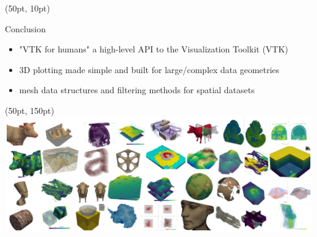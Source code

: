 \documentclass[aspectratio=169,12pt]{beamer}
\begin{document}
\begin{frame}[fragile]
\begin{textblock*}{800pt}(50pt, 10pt)
\begin{block}{Conclusion}
\begin{itemize}
\item "VTK for humans"\: a high-level API to the Visualization Toolkit (VTK)
\item 3D plotting made simple and built for large/complex data geometries
\item mesh data structures and filtering methods for spatial datasets
\end{itemize}
\end{block}
\end{textblock*}
\begin{textblock*}{800pt}(50pt, 150pt)
\includegraphics[width=0.50\linewidth]{pyvista_banner_small.png}
\end{textblock*}
\end{frame}
\end{document}
